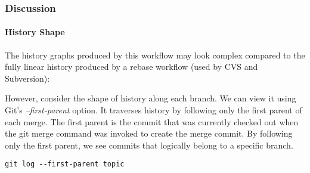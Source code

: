 \subsubsection{Discussion}
\label{subpar:Discussion}

\paragraph{History Shape}
\label{par:HistoryShape}

The history graphs produced by this workflow may look complex compared to the
fully linear history produced by a rebase workflow (used by CVS and Subversion):

\begin{figure}
\centering
{}
\label{fig:ComplexHistory}
\end{figure}

However, consider the shape of history along each branch. We can view it using
Git's \textit{--first-parent} option. It traverses history by following only the
first parent of each merge. The first parent is the commit that was currently
checked out when the git merge command was invoked to create the merge commit.
By following only the first parent, we see commits that logically belong to a
specific branch.

\begin{verbatim}
git log --first-parent topic
\end{verbatim}

\begin{figure}
\centering
{}
\label{fig:ParentCommitInTopicBranch}
\end{figure}


